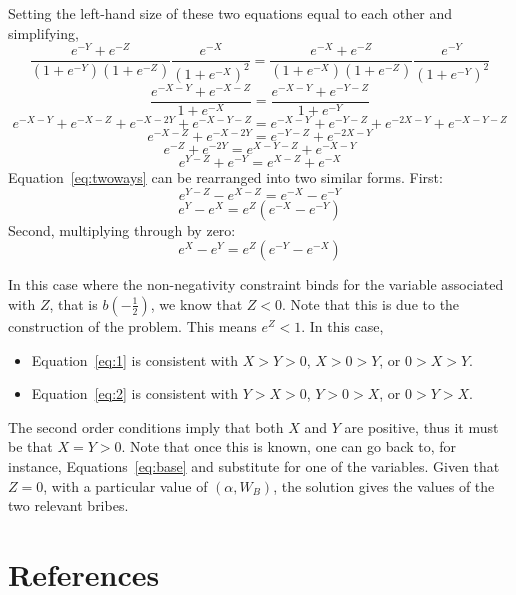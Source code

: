 \documentclass[12pt]{article}
\begin{document}
		Setting the left-hand size of these two equations equal to each other and simplifying,
		\[
		  \frac{e^{-Y} + e^{-Z}}{\left(1+e^{-Y}\right)\left(1+e^{-Z}\right)} \frac{e^{-X}}{\left(1+e^{-X}\right)^2}= \frac{e^{-X} + e^{-Z}}{\left(1+e^{-X}\right)\left(1+e^{-Z}\right)} \frac{e^{-Y}}{\left(1+e^{-Y}\right)^2}
		\]
		\[
		  \frac{e^{-X-Y} + e^{-X-Z}}{1+e^{-X}}= \frac{e^{-X-Y} + e^{-Y-Z}}{1+e^{-Y}}
		\]
		\[
		  e^{-X-Y} + e^{-X-Z} + e^{-X-2Y} +e^{-X-Y-Z}= e^{-X-Y} + e^{-Y-Z} + e^{-2X-Y} +e^{-X-Y-Z}
		\]
		\[
		  e^{-X-Z} +e^{-X-2Y}= e^{-Y-Z} +e^{-2X-Y}
		\]
		\[
		  e^{-Z} +e^{-2Y}= e^{X-Y-Z} +e^{-X-Y}
		\]
		\begin{equation}
		  e^{Y-Z} +e^{-Y}= e^{X-Z} +e^{-X}
			\label{eq:twoways}
		\end{equation}
   Equation~\ref{eq:twoways} can be rearranged into two similar forms. First:
		\[
		  e^{Y-Z} - e^{X-Z}= e^{-X} - e^{-Y}
		\]
		\begin{equation}
		  e^{Y} - e^{X}= e^Z\left(e^{-X} - e^{-Y}\right)
			\label{eq:1}
		\end{equation}
  	Second, multiplying through by zero:
	  \begin{equation}
		  e^{X} - e^{Y}= e^Z\left(e^{-Y} - e^{-X}\right)
			\label{eq:2}
		\end{equation}
		
In this case where the non-negativity constraint binds for the variable associated with $Z$, that is $b\left(-\frac{1}{2}\right)$, we know that $Z < 0$. Note that this is due to the construction of the problem. This means $e^Z < 1$. In this case,
	\begin{itemize}
		\item Equation~\ref{eq:1} is consistent with $X>Y>0$, $X>0>Y$, or $0>X>Y$.
		\item Equation~\ref{eq:2} is consistent with $Y>X>0$, $Y>0>X$, or $0>Y>X$.
	\end{itemize}
The second order conditions imply that both $X$ and $Y$ are positive, thus it must be that $X = Y > 0$. Note that once this is known, one can go back to, for instance, Equations~\ref{eq:base} and substitute for one of the variables. Given that $Z=0$, with a particular value of $\left(\alpha,W_B\right)$, the solution gives the values of the two relevant bribes.



\newpage
\section*{References}
\end{document}
